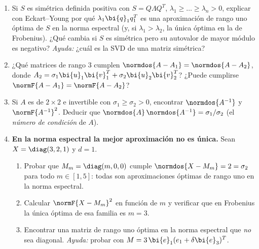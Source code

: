 \begin{enumerate}[leftmargin=*,label=\textbf{\thechapter.\arabic*},ref=\thechapter.\arabic*,itemsep=4pt]
\item {} Si $S$ es simétrica definida positiva con
$S=Q\Lambda Q^T$, $\lambda_1\ge\dots\ge\lambda_n>0$, explicar con
Eckart--Young por qué $\lambda_1\bi{q}_1q_1^T$ es una aproximación de rango
uno óptima de $S$ en la norma espectral (y, si $\lambda_1>\lambda_2$, la única
óptima en la de Frobenius). ¿Qué cambia si $S$ es simétrica pero
su autovalor de mayor módulo es negativo? \emph{Ayuda:} ¿cuál es la SVD de una
matriz simétrica?

\item {} ¿Qué matrices de rango $3$ cumplen
$\normdos{A-A_1}=\normdos{A-A_2}$, donde
$A_2=\sigma_1\bi{u}_1\bi{v}_1^T+\sigma_2\bi{u}_2\bi{v}_2^T$? ¿Puede cumplirse
$\normF{A-A_1}=\normF{A-A_2}$?

\item {} Si $A$ es de $2\times2$ e invertible con
$\sigma_1\ge\sigma_2>0$, encontrar $\normdos{A^{-1}}$ y $\normF{A^{-1}}^2$.
Deducir que $\normdos{A}\,\normdos{A^{-1}}=\sigma_1/\sigma_2$ (el
\emph{número de condición} de $A$).

\item {} \textbf{En la norma espectral la mejor aproximación no
es única.}\label{pca-ej:no-unica} Sean $X=\diag(3,2,1)$ y $d=1$.
\begin{enumerate}[label=(\alph*)]
\item Probar que $M_m=\diag(m,0,0)$ cumple $\normdos{X-M_m}=2=\sigma_2$ para
todo $m\in[1,5]$: todas son aproximaciones óptimas de rango uno en la norma
espectral.
\item Calcular $\normF{X-M_m}^2$ en función de $m$ y verificar que en
Frobenius la única óptima de esa familia es $m=3$.
\item Encontrar una matriz de rango uno óptima en la norma espectral que
\emph{no} sea diagonal. \emph{Ayuda:} probar con
$M=3\,\bi{e}_1(e_1+\delta \bi{e}_3)^T$.
\end{enumerate}


\end{enumerate}
